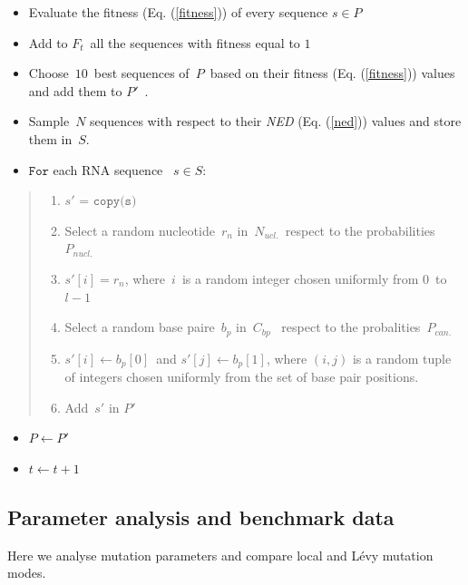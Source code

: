 \begin{itemize}
	\item Evaluate the fitness (Eq. (\ref{fitness})) of every sequence \(s \in P\)
	\item
	Add to \(F_t\)~all the sequences with fitness equal to $1$
	\item
	Choose~\(10\)~best sequences of~\(P\)~based
	on their fitness (Eq. (\ref{fitness})) values and add them to \(P'\)~.
	\item
	Sample~\(N\) sequences with respect to their \textit{NED} (Eq. (\ref{ned})) values and store them in~\(S\).
	\item
	\(\texttt{For}\) each RNA sequence ~\(s \in S\):~
\end{itemize}

\begin{quote}
	\begin{enumerate}
		\item
		\(s'\) = \(\texttt{copy(s)}\)~
		\item
		Select a random nucleotide~\(r_n
		\)
		in~\(N_{ucl.}\)~respect to the
		probabilities~\(P_{nucl.}\)~
		\item
		\(s'[i] = r_n\), where~\(i\)~is a random integer
		chosen uniformly from \(0\)~to \(l-1\)~
		\item
		Select a random base paire~\(b_p
		\) in~\(C_{bp}\)~
		respect to the probalities~\(P_{can.}
		\)
		\item
		\(s'[i] \leftarrow b_p[0]\)~and \(s'[j] \leftarrow b_p[1]\), where \((i,j)\)
		is a random tuple of integers chosen uniformly from the set of base
		pair positions.~
		\item
		Add~\(s'\) in \(P'\)~
	\end{enumerate}
\end{quote}

\begin{itemize}
	\item
	\(P \leftarrow P'\)
	\item
	\(t \leftarrow t + 1\)
\end{itemize}

\subsection{Parameter analysis and benchmark data}
Here we analyse mutation parameters and compare local and Lévy mutation modes. 

